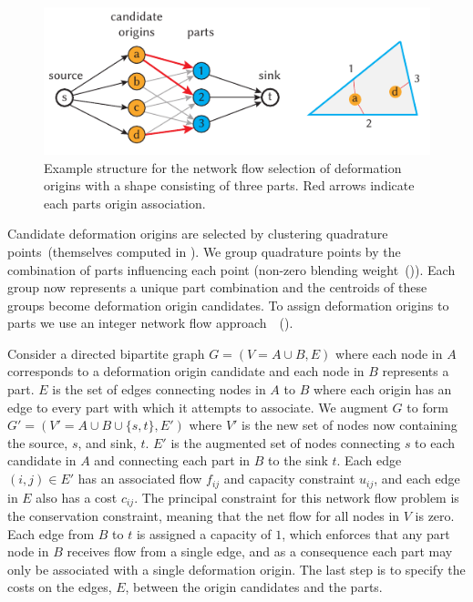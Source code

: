 
\begin{figure}[h]
    \includegraphics[width=\columnwidth]{figures/origin_network}
    \caption{Example structure for the network flow selection of deformation origins with a shape consisting of three parts. Red arrows indicate each parts origin association. }
    \label{fig:network_flow} 
\end{figure}

Candidate deformation origins are selected by clustering quadrature points~(themselves computed in ).
We group quadrature points by the combination of parts influencing each point (non-zero blending weight~()).
Each group now represents a unique part combination and the centroids of these groups become deformation origin candidates.
To assign deformation origins to parts we use an integer network flow approach~~(). 

Consider a directed bipartite graph $G=(V = A \cup B,E)$ where each node in $A$ corresponds to a deformation origin candidate and each node in $B$ represents a part. 
$E$ is the set of edges connecting nodes in $A$ to $B$ where each origin has an edge to every part with which it attempts to associate. 
We augment $G$ to form $G'=(V' = A \cup B \cup \{s,t\}, E')$ where $V'$  is the new set of nodes now containing the source, $s$, and sink, $t$. 
$E'$ is the augmented set of nodes connecting $s$ to each candidate in $A$ and connecting each part in $B$ to the sink $t$. 
Each edge $(i,j) \in E'$ has an associated flow $f_{ij}$ and capacity constraint $u_{ij}$, and each edge in $E$ also has a cost $c_{ij}$. 
The principal constraint for this network flow problem is the conservation constraint, meaning that the net flow for all nodes in $V$ is zero.
Each edge from $B$ to $t$ is assigned a capacity of $1$, which enforces that any part node in $B$ receives flow from a single edge, 
and as a consequence each part may only be associated with a single deformation origin. 
The last step is to specify the costs on the edges, $E$, between the origin candidates and the parts. 

